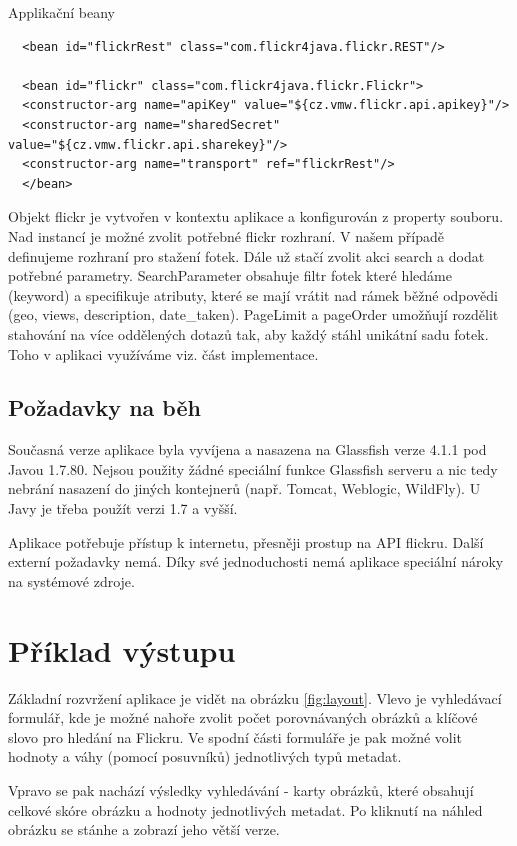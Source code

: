 \documentclass[12pt,oneside,a4paper]{article}
\begin{document}
Applikační beany
\begin{verbatim}
  <bean id="flickrRest" class="com.flickr4java.flickr.REST"/>
  
  <bean id="flickr" class="com.flickr4java.flickr.Flickr">
  <constructor-arg name="apiKey" value="${cz.vmw.flickr.api.apikey}"/>
  <constructor-arg name="sharedSecret" value="${cz.vmw.flickr.api.sharekey}"/>
  <constructor-arg name="transport" ref="flickrRest"/>
  </bean>
\end{verbatim}  
Objekt flickr je vytvořen v kontextu aplikace a konfigurován z property souboru. Nad instancí je možné zvolit potřebné flickr rozhraní. V našem případě definujeme rozhraní pro stažení fotek. Dále už stačí zvolit akci search a dodat potřebné parametry. SearchParameter obsahuje filtr fotek které hledáme (keyword) a specifikuje atributy, které se mají vrátit nad rámek běžné odpovědi (geo, views, description, date\_taken). PageLimit a pageOrder umožňují rozdělit stahování na více oddělených dotazů tak, aby každý stáhl unikátní sadu fotek. Toho v aplikaci využíváme viz. část implementace.
 

\subsection{Požadavky na běh}

Současná verze aplikace byla vyvíjena a nasazena na Glassfish verze 4.1.1 pod Javou 1.7.80. Nejsou použity žádné speciální funkce Glassfish serveru a nic tedy nebrání nasazení do jiných kontejnerů (např. Tomcat, Weblogic, WildFly). U Javy je třeba použít verzi 1.7 a vyšší.

Aplikace potřebuje přístup k internetu, přesněji prostup na API flickru. Další externí požadavky nemá. Díky své jednoduchosti nemá aplikace speciální nároky na systémové zdroje.


\section{Příklad výstupu}
Základní rozvržení aplikace je vidět na obrázku \ref{fig:layout}. Vlevo je vyhledávací formulář, kde je možné nahoře zvolit počet porovnávaných obrázků a klíčové slovo pro hledání na Flickru. Ve spodní části formuláře je pak možné volit hodnoty a váhy (pomocí posuvníků) jednotlivých typů metadat.

Vpravo se pak nachází výsledky vyhledávání - karty obrázků, které obsahují celkové skóre obrázku a hodnoty jednotlivých metadat. Po kliknutí na náhled obrázku se stánhe a zobrazí jeho větší verze.
\end{document}
